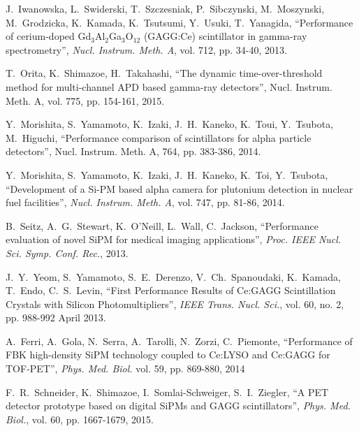 \documentclass[journal]{IEEEtran}
\begin{document}
\ifCLASSOPTIONcaptionsoff
  \newpage
\fi

\begin{thebibliography}{1}

J.~Iwanowska, L.~Swiderski, T.~Szczesniak, P.~Sibczynski, M.~Moszynski, M.~Grodzicka, K.~Kamada, K.~Tsutsumi, Y.~Usuki, T.~Yanagida, ``Performance of cerium-doped Gd$_{3}$Al$_{2}$Ga$_{3}$O$_{12}$ (GAGG:Ce) scintillator in gamma-ray spectrometry'', \emph{Nucl. Instrum. Meth. A}, vol. 712, pp. 34-40, 2013.

T.~Orita, K.~Shimazoe, H.~Takahashi, ``The dynamic time-over-threshold method for multi-channel APD based gamma-ray detectors'', Nucl. Instrum. Meth. A, vol. 775, pp. 154-161, 2015. 

Y.~Morishita, S.~Yamamoto, K.~Izaki, J.~H.~Kaneko, K.~Toui, Y.~Tsubota, M.~Higuchi, ``Performance comparison of scintillators for alpha particle detectors'', Nucl. Instrum. Meth. A, 764, pp. 383-386, 2014. 

Y.~Morishita, S.~Yamamoto, K.~Izaki, J.~H.~Kaneko, K.~Toi, Y.~Tsubota, ``Development of a Si-PM based alpha camera for plutonium detection in nuclear fuel facilities'', \emph{Nucl. Instrum. Meth. A}, vol. 747, pp. 81-86, 2014.

B.~Seitz, A.~G.~Stewart, K.~O'Neill, L.~Wall, C.~Jackson, ``Performance evaluation of novel SiPM for medical imaging applications'', \emph{Proc. IEEE Nucl. Sci. Symp. Conf. Rec.}, 2013. 

J.~Y.~Yeom, S.~Yamamoto, S.~E.~Derenzo, V.~Ch.~Spanoudaki, K.~Kamada, T.~Endo, C.~S.~Levin, ``First Performance Results of Ce:GAGG Scintillation Crystals with Silicon Photomultipliers'', \emph{IEEE Trans. Nucl. Sci.}, vol. 60, no. 2, pp. 988-992 April 2013.

A.~Ferri, A.~Gola, N.~Serra, A.~Tarolli, N.~Zorzi, C.~Piemonte, ``Performance of FBK high-density SiPM technology coupled to Ce:LYSO and Ce:GAGG for TOF-PET'', \emph{Phys. Med. Biol.} vol. 59, pp. 869-880, 2014

F.~R.~Schneider, K.~Shimazoe, I.~Somlai-Schweiger, S.~I.~Ziegler, ``A PET detector prototype based on digital SiPMs and GAGG scintillators'', \emph{Phys. Med. Biol.}, vol. 60, pp. 1667-1679, 2015. 


\end{thebibliography}
\end{document}
